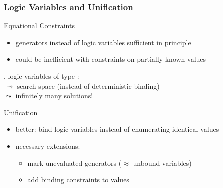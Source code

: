 \documentclass[10pt]{beamer}
\begin{document}
\begin{frame}
\frametitle{Logic Variables and Unification}

\begin{block}{Equational Constraints}
\begin{itemize}
\item generators instead of logic variables sufficient in principle
\item could be inefficient with constraints on partially known values
\end{itemize}
\end{block}
\vfill
\pause

\begin{exampleblock}{}
, logic variables of type \code{[Bool]}:\\
\pause
{} $~\leadsto$ search space (instead of deterministic binding)\\
\pause
{} \hspace{5.7ex}$\leadsto$ infinitely many solutions!
\end{exampleblock}
\vfill
\pause

\begin{block}{Unification}
\begin{itemize}
\item better: bind logic variables instead of enumerating identical values
\item necessary extensions:
\begin{itemize}
\item mark unevaluated generators ($\approx$ unbound variables)
\item add binding constraints to values
\end{itemize}
\end{itemize}
\end{block}
\end{frame}
\end{document}
